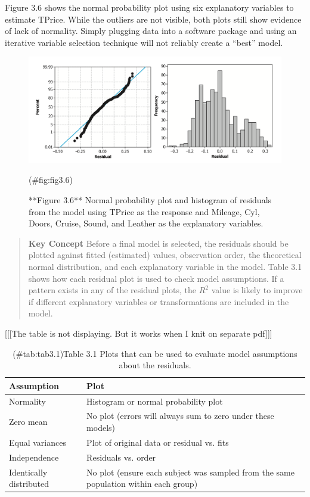 \documentclass[
]{report}
\begin{document}
Figure 3.6 shows the normal probability plot using six explanatory variables to estimate TPrice. While the outliers are not visible, both plots still show evidence of lack of normality. Simply plugging data into a software package and using an iterative variable selection technique will not reliably create a ``best'' model.

\begin{figure}

{\centering \includegraphics[width=1\linewidth]{docs/Fig3_6} 

}

\caption{**Figure 3.6** Normal probability plot and histogram of residuals from the model using TPrice as the response and Mileage, Cyl, Doors, Cruise, Sound, and Leather as the explanatory variables.}(\#fig:fig3.6)
\end{figure}

\begin{quote}
\textbf{Key Concept}
Before a final model is selected, the residuals should be plotted against fitted (estimated) values, observation order, the theoretical normal distribution, and each explanatory variable in the model. Table 3.1 shows how each residual plot is used to check model assumptions. If a pattern exists in any of the residual plots, the \(R^2\) value is likely to improve if different explanatory variables or transformations are included in the model.
\end{quote}

{[}{[}{[}The table is not displaying. But it works when I knit on separate pdf{]}{]}{]}

\begin{table}[!h]
\centering
\caption{(\#tab:tab3.1)Table 3.1 Plots that can be used to evaluate model assumptions about the residuals.}
\centering
\begin{tabular}[t]{ll}
\toprule
Assumption & Plot\\
\midrule
Normality & Histogram or normal probability plot\\
Zero mean & No plot (errors will always sum to zero under these models)\\
Equal variances & Plot of original data or residual vs. fits\\
Independence & Residuals vs. order\\
Identically distributed & No plot (ensure each subject was sampled from the same population within each group)\\
\bottomrule
\end{tabular}
\end{table}
\end{document}
